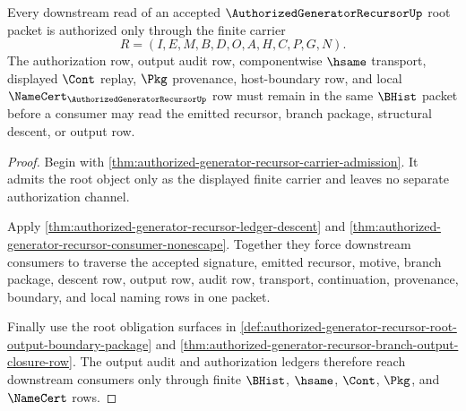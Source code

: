 \begin{theorem}
\label{thm:authorized-generator-recursor-root-authorization-downstream-surface}
Every downstream read of an accepted $\AuthorizedGeneratorRecursorUp$ root packet is authorized only through the finite carrier
$$
R=(I,E,M,B,D,O,A,H,C,P,G,N).
$$
The authorization row, output audit row, componentwise $\hsame$ transport, displayed $\Cont$ replay, $\Pkg$ provenance, host-boundary row, and local $\NameCert_{\AuthorizedGeneratorRecursorUp}$ row must remain in the same $\BHist$ packet before a consumer may read the emitted recursor, branch package, structural descent, or output row.
\end{theorem}
\begin{proof}
Begin with \autoref{thm:authorized-generator-recursor-carrier-admission}. It admits the root object only as the displayed finite carrier and leaves no separate authorization channel.

Apply \autoref{thm:authorized-generator-recursor-ledger-descent} and \autoref{thm:authorized-generator-recursor-consumer-nonescape}. Together they force downstream consumers to traverse the accepted signature, emitted recursor, motive, branch package, descent row, output row, audit row, transport, continuation, provenance, boundary, and local naming rows in one packet.

Finally use the root obligation surfaces in \autoref{def:authorized-generator-recursor-root-output-boundary-package} and \autoref{thm:authorized-generator-recursor-branch-output-closure-row}. The output audit and authorization ledgers therefore reach downstream consumers only through finite $\BHist$, $\hsame$, $\Cont$, $\Pkg$, and $\NameCert$ rows.
\end{proof}

